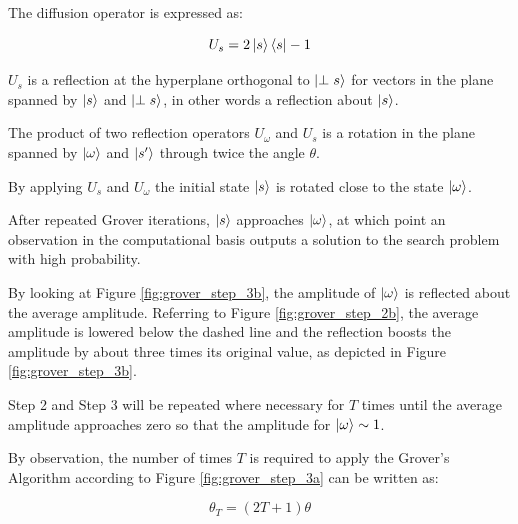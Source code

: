 \documentclass{article}
\begin{document}
\noindent
The diffusion operator is expressed as:
\vspace{5mm}

\begin{equation}
U_s  = 2 \ket{s}\bra{s} - 1    
\end{equation}
\vspace{5mm}

\noindent
$U_s$ is a reflection at the hyperplane orthogonal to $\ket{\perp s}$  for vectors in the plane spanned by $\ket{s}$  and $\ket{\perp s}$, in other words a reflection about $\ket{s}$. 
\vspace{5mm}

\noindent
The product of two reflection operators $U_\omega$ and $U_s$ is a rotation in the plane spanned by $\ket{\omega}$ and $\ket{s'}$ through twice the angle $\theta$.
\vspace{5mm}

\noindent
By applying $U_s$ and $U_\omega$ the initial state $\ket{s}$ is rotated close to the state $\ket{\omega}$.
\vspace{5mm}

\noindent
After repeated Grover iterations, $\ket{s}$ approaches $\ket{\omega}$, at which point an observation in the computational basis
outputs a solution to the search problem with high probability.
\vspace{5mm}

\noindent
By looking at Figure \ref{fig:grover_step_3b}, the amplitude of $\ket{\omega}$ is reflected about the average amplitude. Referring to Figure \ref{fig:grover_step_2b}, the average amplitude is lowered below the dashed line and the reflection boosts the amplitude by about three times its original value, as depicted in Figure \ref{fig:grover_step_3b}.
\vspace{5mm}

\noindent
Step 2 and Step 3 will be repeated where necessary for $T$ times until the average amplitude approaches zero so that the amplitude for $\ket{\omega} \sim 1$\cite{de_wolf_main_nodate}.
\vspace{5mm}

\noindent
By observation, the number of times $T$ is required to apply the Grover's Algorithm according to Figure \ref{fig:grover_step_3a} can be written as:
\vspace{5mm}

\noindent
\begin{equation}
\theta_T = (2T + 1)\theta
\end{equation}
\end{document}
